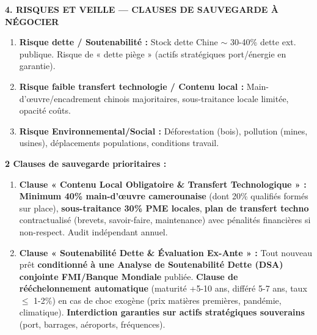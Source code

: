 \documentclass[11pt]{article}
\begin{document}
\begin{corrige}
\vspace{0.3cm}
\noindent\textbf{4. RISQUES ET VEILLE — CLAUSES DE SAUVEGARDE À NÉGOCIER}
\begin{enumerate}
    \item \textbf{Risque dette / Soutenabilité :} Stock dette Chine $\sim$ 30-40\% dette ext. publique. Risque de « dette piège » (actifs stratégiques port/énergie en garantie).
    \item \textbf{Risque faible transfert technologie / Contenu local :} Main-d'œuvre/encadrement chinois majoritaires, sous-traitance locale limitée, opacité coûts.
    \item \textbf{Risque Environnemental/Social :} Déforestation (bois), pollution (mines, usines), déplacements populations, conditions travail.
\end{enumerate}
\textbf{2 Clauses de sauvegarde prioritaires :}
\begin{enumerate}
    \item \textbf{Clause « Contenu Local Obligatoire \& Transfert Technologique » :} \textbf{Minimum 40\% main-d'œuvre camerounaise} (dont 20\% qualifiés formés sur place), \textbf{sous-traitance 30\% PME locales}, \textbf{plan de transfert techno} contractualisé (brevets, savoir-faire, maintenance) avec pénalités financières si non-respect. Audit indépendant annuel.
    \item \textbf{Clause « Soutenabilité Dette \& Évaluation Ex-Ante » :} Tout nouveau prêt \textbf{conditionné à une Analyse de Soutenabilité Dette (DSA) conjointe FMI/Banque Mondiale} publiée. \textbf{Clause de rééchelonnement automatique} (maturité +5-10 ans, différé 5-7 ans, taux $\le$ 1-2\%) en cas de choc exogène (prix matières premières, pandémie, climatique). \textbf{Interdiction garanties sur actifs stratégiques souverains} (port, barrages, aéroports, fréquences).
\end{enumerate}


\end{corrige}
\end{document}
